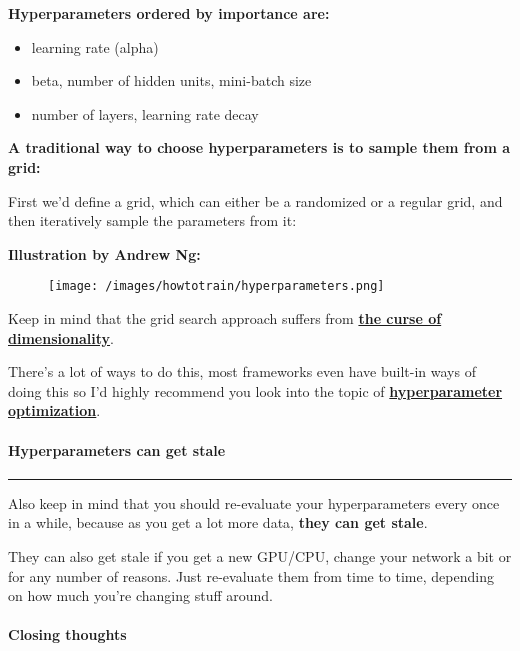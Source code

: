 \documentclass[
]{article}
\begin{document}
\textbf{Hyperparameters ordered by importance are:}

\begin{itemize}
\item
  learning rate (alpha)
\item
  beta, number of hidden units, mini-batch size
\item
  number of layers, learning rate decay
\end{itemize}

\textbf{A traditional way to choose hyperparameters is to sample them
from a grid:}

First we'd define a grid, which can either be a randomized or a regular
grid, and then iteratively sample the parameters from it:

\textbf{Illustration by Andrew Ng:}

\begin{figure}
\centering
\texttt{[image: /images/howtotrain/hyperparameters.png]}
\caption{}
\end{figure}

Keep in mind that the grid search approach suffers from
\textbf{\href{https://www.wikiwand.com/en/Curse_of_dimensionality}{the
curse of dimensionality}}.

There's a lot of ways to do this, most frameworks even have built-in
ways of doing this so I'd highly recommend you look into the topic of
\textbf{\href{https://www.wikiwand.com/en/Hyperparameter_optimization}{hyperparameter
optimization}}.

\hypertarget{header-n284}{%
\paragraph{\texorpdfstring{\textbf{Hyperparameters can get
stale}}{Hyperparameters can get stale}}\label{header-n284}}

\begin{center}\rule{0.5\linewidth}{0.5pt}\end{center}

Also keep in mind that you should re-evaluate your hyperparameters every
once in a while, because as you get a lot more data, \textbf{they can
get stale}.

They can also get stale if you get a new GPU/CPU, change your network a
bit or for any number of reasons. Just re-evaluate them from time to
time, depending on how much you're changing stuff around.

\hypertarget{header-n288}{%
\paragraph{Closing thoughts}\label{header-n288}}
\end{document}
